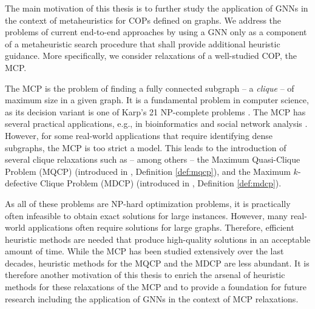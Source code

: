 \documentclass[draft,final]{vutinfth} %
\begin{document}
The main motivation of this thesis is to further study the application of GNNs in the context of metaheuristics for COPs defined on graphs. We address the problems of current end-to-end approaches by using a GNN only as a component of a metaheuristic search procedure that shall provide additional heuristic guidance. More specifically, we consider relaxations of a well-studied COP, the MCP. 

The MCP is the problem of finding a fully connected subgraph -- a \textit{clique} -- of maximum size in a given graph. It is a fundamental problem in computer science, as its decision variant is one of Karp's 21 NP-complete problems \cite{Karp1972}. The MCP has several practical applications, e.g.,  in bioinformatics \cite{Dognin2010} and social network analysis \cite{Pattillo_network_analysis_2013}. However, for some real-world applications that require identifying dense subgraphs, the MCP is too strict a model. This leads to the introduction of several clique relaxations such as -- among others -- the Maximum Quasi-Clique Problem (MQCP) (introduced in \cite{Abello2002}, Definition \ref{def:mqcp}), and the Maximum $k$-defective Clique Problem (MDCP) (introduced in \cite{Yu2006}, Definition \ref{def:mdcp}). 

As all of these problems are NP-hard optimization problems, it is practically often infeasible to obtain exact solutions for large instances. However, many real-world applications often require solutions for large graphs. Therefore, efficient heuristic methods are needed that produce high-quality solutions in an acceptable amount of time. While the MCP has been studied extensively over the last decades, heuristic methods for the MQCP and the MDCP are less abundant. It is therefore another motivation of this thesis to enrich the arsenal of heuristic methods for these relaxations of the MCP and to provide a foundation for future research including the application of GNNs in the context of MCP relaxations. 
\end{document}
